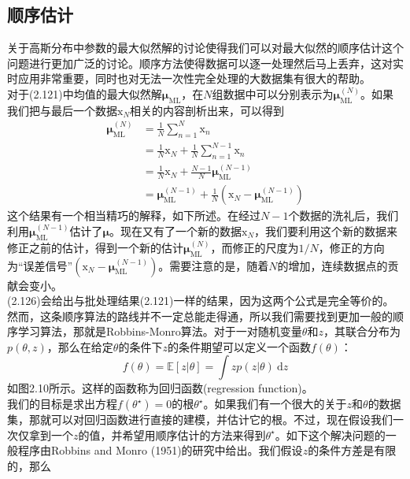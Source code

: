 \documentclass[b5paper]{book}
\numberwithin{equation}{chapter}
\newcommand {\bx} {\boldsymbol{\mathrm{x}}}
\newcommand {\bfMu} {\boldsymbol{\mu}}
\begin{document}
	\subsection{顺序估计}
	\textnormal{
	关于高斯分布中参数的最大似然解的讨论使得我们可以对最大似然的顺序估计这个问题进行更加广泛的讨论。顺序方法使得数据可以逐一处理然后马上丢弃，这对实时应用非常重要，同时也对无法一次性完全处理的大数据集有很大的帮助。\\
	\indent 对于(2.121)中均值的最大似然解$\bfMu_{\mathrm{ML}}$，在$N$组数据中可以分别表示为$\bfMu_{\mathrm{ML}}^{(N)}$。如果我们把与最后一个数据$\bx_N$相关的内容剖析出来，可以得到
	\begin{equation}
	\begin{split}
		\bfMu_{\mathrm{ML}}^{(N)} &= \frac{1}{N}\sum_{n=1}^N \bx_n \\
		&= \frac{1}{N}\bx_N+\frac{1}{N}\sum_{n=1}^{N-1}\bx_n \\
		&= \frac{1}{N}\bx_N + \frac{N-1}{N}\bfMu_{\mathrm{ML}}^{(N-1)} \\
		&= \bfMu_{\mathrm{ML}}^{(N-1)}+\frac{1}{N}(\bx_{N}-\bfMu_{\mathrm{ML}}^{(N-1)})
	\end{split}
	\end{equation}
	这个结果有一个相当精巧的解释，如下所述。在经过$N-1$个数据的洗礼后，我们利用$\bfMu_{\mathrm{ML}}^{(N-1)}$估计了$\bfMu$。现在又有了一个新的数据$\bx_N$，我们要利用这个新的数据来修正之前的估计，得到一个新的估计$\bfMu_{\mathrm{ML}}^{(N)}$，而修正的尺度为$1/N$，修正的方向为“误差信号”$(\bx_N-\bfMu_{\mathrm{ML}}^{(N-1)})$。需要注意的是，随着$N$的增加，连续数据点的贡献会变小。\\
	\indent (2.126)会给出与批处理结果(2.121)一样的结果，因为这两个公式是完全等价的。然而，这条顺序算法的路线并不一定总能走得通，所以我们需要找到更加一般的顺序学习算法，那就是Robbins-Monro算法。对于一对随机变量$\theta$和$z$，其联合分布为$p(\theta,z)$，那么在给定$\theta$的条件下$z$的条件期望可以定义一个函数$f(\theta)$：
	\begin{equation}
		f(\theta)=\mathbb{E}[z|\theta]=\int zp(z|\theta)\ \mathrm{d}z
	\end{equation}
	如图2.10所示。这样的函数称为回归函数(regression function)。\\
	\indent 我们的目标是求出方程$f(\theta^{\star})=0$的根$\theta^{\star}$。如果我们有一个很大的关于$z$和$\theta$的数据集，那就可以对回归函数进行直接的建模，并估计它的根。不过，现在假设我们一次仅拿到一个$z$的值，并希望用顺序估计的方法来得到$\theta^{\star}$。如下这个解决问题的一般程序由Robbins and Monro (1951)的研究中给出。我们假设$z$的条件方差是有限的，那么
}
\end{document}
